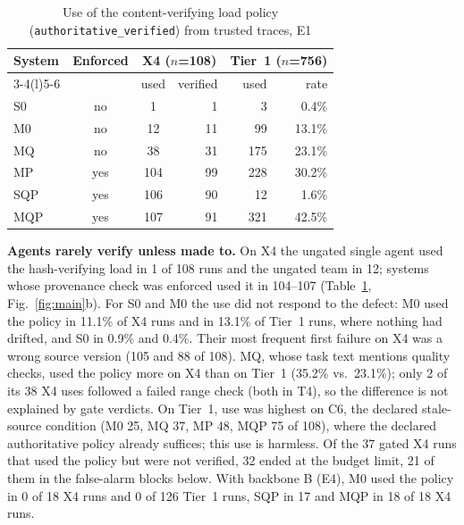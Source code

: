\documentclass[conference]{IEEEtran}
\newcommand{\sys}[1]{\textsf{#1}}
\begin{document}
\begin{table}[t]
\caption{Use of the content-verifying load policy (\texttt{authoritative\_verified}) from trusted traces, E1}
\label{tab:verify}
\centering\footnotesize\setlength{\tabcolsep}{4pt}
\begin{tabular}{@{}lccrrr@{}}
\toprule
System & Enforced & \multicolumn{2}{c}{X4 ($n$=108)} & \multicolumn{2}{c}{Tier~1 ($n$=756)} \\
\cmidrule(lr){3-4}\cmidrule(l){5-6}
 & & used & verified & used & rate \\
\midrule
\sys{S0}  & no  & 1   & 1  & 3   & 0.4\% \\
\sys{M0}  & no  & 12  & 11 & 99  & 13.1\% \\
\sys{MQ}  & no  & 38  & 31 & 175 & 23.1\% \\
\sys{MP}  & yes & 104 & 99 & 228 & 30.2\% \\
\sys{SQP} & yes & 106 & 90 & 12  & 1.6\% \\
\sys{MQP} & yes & 107 & 91 & 321 & 42.5\% \\
\bottomrule
\end{tabular}
\end{table}

\textbf{Agents rarely verify unless made to.} On X4 the ungated single agent used the hash-verifying load in 1 of 108
runs and the ungated team in 12; systems whose provenance check was enforced used it in 104--107
(Table~\ref{tab:verify}, Fig.~\ref{fig:main}b). For \sys{S0} and \sys{M0} the use did not respond to the defect:
\sys{M0} used the policy in 11.1\% of X4 runs and in 13.1\% of Tier~1 runs, where nothing had drifted, and \sys{S0} in
0.9\% and 0.4\%. Their most frequent first failure on X4 was a wrong source version (105 and 88 of 108). \sys{MQ},
whose task text mentions quality checks, used the policy more on X4 than on Tier~1 (35.2\% vs.\ 23.1\%); only 2 of
its 38 X4 uses followed a failed range check (both in T4), so the difference is not explained by gate verdicts. On
Tier~1, use was highest on C6, the declared stale-source condition (\sys{M0} 25, \sys{MQ} 37, \sys{MP} 48, \sys{MQP} 75
of 108), where the declared authoritative policy already suffices; this use is harmless. Of the 37 gated X4 runs that
used the policy but were not verified, 32 ended at the budget limit, 21 of them in the false-alarm blocks below. With
backbone B (E4), \sys{M0} used the policy in 0 of 18 X4 runs and 0 of 126 Tier~1 runs, \sys{SQP} in 17 and \sys{MQP} in
18 of 18 X4 runs.
\end{document}
